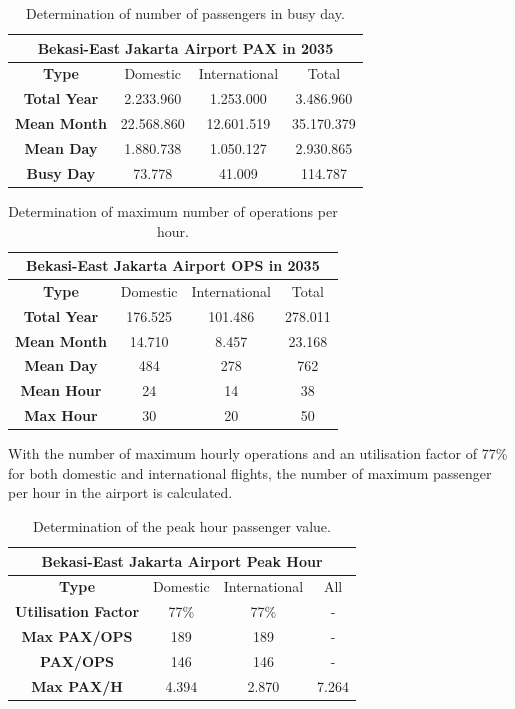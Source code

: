 \begin{table}[H]
	\label{table:'BusyDayPAX'}
	\centering
	\begin{tabular}{|c|c|c|c|}
		\hline 
		\multicolumn{4}{|c|}{\textbf{Bekasi-East Jakarta Airport PAX in 2035}}\tabularnewline
		\hline 
		\textbf{Type} & Domestic & International & Total\tabularnewline
		\hline 
		\textbf{Total Year} & 2.233.960  & 1.253.000  & 3.486.960 \tabularnewline
		\hline 
		\textbf{Mean Month} & 22.568.860  & 12.601.519  & 35.170.379 \tabularnewline
		\hline 
		\textbf{Mean Day} & 1.880.738  & 1.050.127  & 2.930.865 \tabularnewline
		\hline 
		\textbf{Busy Day} & 73.778  & 41.009  & 114.787 \tabularnewline
		\hline 
	\end{tabular}
	\caption{Determination of number of passengers in busy day.}
\end{table}

\begin{table}[H]
	\label{table:'BusyDayOPS'}
	\centering
	\begin{tabular}{|c|c|c|c|}
		\hline 
		\multicolumn{4}{|c|}{\textbf{Bekasi-East Jakarta Airport OPS in 2035}}\tabularnewline
		\hline 
		\textbf{Type} & Domestic & International & Total\tabularnewline
		\hline 
		\textbf{Total Year} & 176.525  & 101.486  & 278.011 \tabularnewline
		\hline 
		\textbf{Mean Month} & 14.710  & 8.457  & 23.168 \tabularnewline
		\hline 
		\textbf{Mean Day} & 484  & 278  & 762 \tabularnewline
		\hline 
		\textbf{Mean Hour} & 24  & 14  & 38 \tabularnewline
		\hline 
		\textbf{Max Hour} & 30  & 20  & 50 \tabularnewline
		\hline 
	\end{tabular}
	\caption{Determination of maximum number of operations per hour.}
\end{table}

With the number of maximum hourly operations and an utilisation factor of 77\% for both domestic and international flights, the number of maximum passenger per hour in the airport is calculated.

\begin{table}[H]
	\label{table:'PAXperhour'}
	\centering
\begin{tabular}{|c|c|c|c|}
	\hline 
	\multicolumn{4}{|c|}{\textbf{Bekasi-East Jakarta Airport Peak Hour}}\tabularnewline
	\hline 
	\textbf{Type} & Domestic & International & All\tabularnewline
	\hline 
	\textbf{Utilisation Factor} & 77\% & 77\% & -\tabularnewline
	\hline 
	\textbf{Max PAX/OPS} & 189 & 189 & -\tabularnewline
	\hline 
	\textbf{PAX/OPS} & 146 & 146 & -\tabularnewline
	\hline 
	\textbf{Max PAX/H} & 4.394 & 2.870 & 7.264\tabularnewline
	\hline 
\end{tabular}
\caption{Determination of the peak hour passenger value.}
\end{table}

	
	